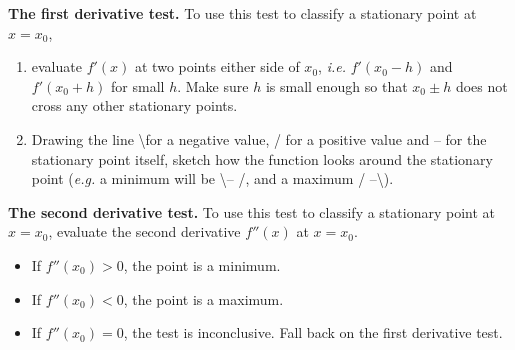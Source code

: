 \textbf{The first derivative test.} To use this test to classify a stationary point at $x=x_0$, 
\begin{enumerate}
    \item evaluate $f'(x)$ at two points either side of $x_0$, \emph{i.e.} $f'(x_0-h)$ and $f'(x_0+h)$ for small $h$. Make sure $h$ is small enough so that $x_0 \pm h$ does not cross any other stationary points.
    \item Drawing the line \textbackslash for a negative value, / for a positive value and -- for the stationary point itself, sketch how the function looks around the stationary point (\textit{e.g.} a minimum will be \textbackslash -- /, and a maximum  / --\textbackslash).
\end{enumerate}

\textbf{The second derivative test.} To use this test to classify a stationary point at $x=x_0$, evaluate the second derivative $f''(x)$ at $x=x_0$.
\begin{itemize}
    \item If $f''(x_0) > 0$, the point is a minimum.
    \item If $f''(x_0) < 0$, the point is a maximum.
    \item If $f''(x_0) = 0$, the test is inconclusive. Fall back on the first derivative test. 
\end{itemize}

